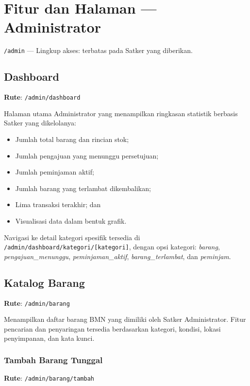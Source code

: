 \documentclass[
  12pt,
  a4paper,
  oneside,
  final
]{report}
\begin{document}
\chapter{Fitur dan Halaman --- Administrator}

\verb|/admin| --- Lingkup akses: terbatas pada Satker yang diberikan.

\section{Dashboard}
\textbf{Rute}: \texttt{/admin/dashboard}

Halaman utama Administrator yang menampilkan ringkasan statistik
berbasis Satker yang dikelolanya:
\begin{itemize}
  \item Jumlah total barang dan rincian stok;
  \item Jumlah pengajuan yang menunggu persetujuan;
  \item Jumlah peminjaman aktif;
  \item Jumlah barang yang terlambat dikembalikan;
  \item Lima transaksi terakhir; dan
  \item Visualisasi data dalam bentuk grafik.
\end{itemize}

Navigasi ke detail kategori spesifik tersedia di
\texttt{/admin/dashboard/kategori/[kategori]}, dengan opsi
kategori: {\it barang}, {\it pengajuan\_menunggu},
{\it peminjaman\_aktif}, {\it barang\_terlambat},
dan {\it peminjam}.

\section{Katalog Barang}
\textbf{Rute}: \texttt{/admin/barang}

Menampilkan daftar barang BMN yang dimiliki oleh Satker Administrator.
Fitur pencarian dan penyaringan tersedia berdasarkan kategori,
kondisi, lokasi penyimpanan, dan kata kunci.

\subsection{Tambah Barang Tunggal}
\textbf{Rute}: \texttt{/admin/barang/tambah}
\end{document}

